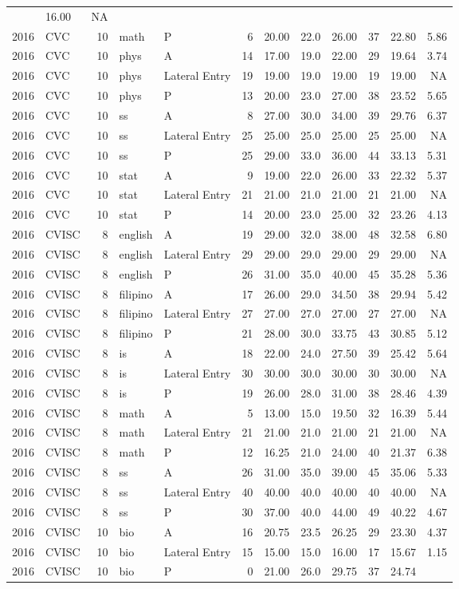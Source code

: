\documentclass[]{article}
\begin{document}
\begin{longtable}[]{@{}rlrllrrrrrrr@{}}
& 16.00 & NA\tabularnewline
2016 & CVC & 10 & math & P & 6 & 20.00 & 22.0 & 26.00 & 37 & 22.80 &
5.86\tabularnewline
2016 & CVC & 10 & phys & A & 14 & 17.00 & 19.0 & 22.00 & 29 & 19.64 &
3.74\tabularnewline
2016 & CVC & 10 & phys & Lateral Entry & 19 & 19.00 & 19.0 & 19.00 & 19
& 19.00 & NA\tabularnewline
2016 & CVC & 10 & phys & P & 13 & 20.00 & 23.0 & 27.00 & 38 & 23.52 &
5.65\tabularnewline
2016 & CVC & 10 & ss & A & 8 & 27.00 & 30.0 & 34.00 & 39 & 29.76 &
6.37\tabularnewline
2016 & CVC & 10 & ss & Lateral Entry & 25 & 25.00 & 25.0 & 25.00 & 25 &
25.00 & NA\tabularnewline
2016 & CVC & 10 & ss & P & 25 & 29.00 & 33.0 & 36.00 & 44 & 33.13 &
5.31\tabularnewline
2016 & CVC & 10 & stat & A & 9 & 19.00 & 22.0 & 26.00 & 33 & 22.32 &
5.37\tabularnewline
2016 & CVC & 10 & stat & Lateral Entry & 21 & 21.00 & 21.0 & 21.00 & 21
& 21.00 & NA\tabularnewline
2016 & CVC & 10 & stat & P & 14 & 20.00 & 23.0 & 25.00 & 32 & 23.26 &
4.13\tabularnewline
2016 & CVISC & 8 & english & A & 19 & 29.00 & 32.0 & 38.00 & 48 & 32.58
& 6.80\tabularnewline
2016 & CVISC & 8 & english & Lateral Entry & 29 & 29.00 & 29.0 & 29.00 &
29 & 29.00 & NA\tabularnewline
2016 & CVISC & 8 & english & P & 26 & 31.00 & 35.0 & 40.00 & 45 & 35.28
& 5.36\tabularnewline
2016 & CVISC & 8 & filipino & A & 17 & 26.00 & 29.0 & 34.50 & 38 & 29.94
& 5.42\tabularnewline
2016 & CVISC & 8 & filipino & Lateral Entry & 27 & 27.00 & 27.0 & 27.00
& 27 & 27.00 & NA\tabularnewline
2016 & CVISC & 8 & filipino & P & 21 & 28.00 & 30.0 & 33.75 & 43 & 30.85
& 5.12\tabularnewline
2016 & CVISC & 8 & is & A & 18 & 22.00 & 24.0 & 27.50 & 39 & 25.42 &
5.64\tabularnewline
2016 & CVISC & 8 & is & Lateral Entry & 30 & 30.00 & 30.0 & 30.00 & 30 &
30.00 & NA\tabularnewline
2016 & CVISC & 8 & is & P & 19 & 26.00 & 28.0 & 31.00 & 38 & 28.46 &
4.39\tabularnewline
2016 & CVISC & 8 & math & A & 5 & 13.00 & 15.0 & 19.50 & 32 & 16.39 &
5.44\tabularnewline
2016 & CVISC & 8 & math & Lateral Entry & 21 & 21.00 & 21.0 & 21.00 & 21
& 21.00 & NA\tabularnewline
2016 & CVISC & 8 & math & P & 12 & 16.25 & 21.0 & 24.00 & 40 & 21.37 &
6.38\tabularnewline
2016 & CVISC & 8 & ss & A & 26 & 31.00 & 35.0 & 39.00 & 45 & 35.06 &
5.33\tabularnewline
2016 & CVISC & 8 & ss & Lateral Entry & 40 & 40.00 & 40.0 & 40.00 & 40 &
40.00 & NA\tabularnewline
2016 & CVISC & 8 & ss & P & 30 & 37.00 & 40.0 & 44.00 & 49 & 40.22 &
4.67\tabularnewline
2016 & CVISC & 10 & bio & A & 16 & 20.75 & 23.5 & 26.25 & 29 & 23.30 &
4.37\tabularnewline
2016 & CVISC & 10 & bio & Lateral Entry & 15 & 15.00 & 15.0 & 16.00 & 17
& 15.67 & 1.15\tabularnewline
2016 & CVISC & 10 & bio & P & 0 & 21.00 & 26.0 & 29.75 & 37 & 24.74 &

\end{longtable}
\end{document}
